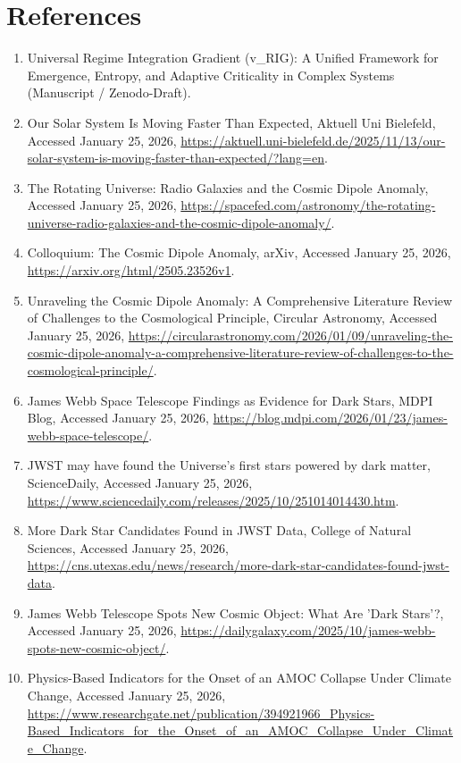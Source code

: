 \documentclass[11pt,a4paper]{article}
\begin{document}
\section*{References}

\begin{enumerate}
\item Universal Regime Integration Gradient (v\_RIG): A Unified Framework for Emergence, Entropy, and Adaptive Criticality in Complex Systems (Manuscript / Zenodo-Draft).
\item Our Solar System Is Moving Faster Than Expected, Aktuell Uni Bielefeld, Accessed January 25, 2026, \url{https://aktuell.uni-bielefeld.de/2025/11/13/our-solar-system-is-moving-faster-than-expected/?lang=en}.
\item The Rotating Universe: Radio Galaxies and the Cosmic Dipole Anomaly, Accessed January 25, 2026, \url{https://spacefed.com/astronomy/the-rotating-universe-radio-galaxies-and-the-cosmic-dipole-anomaly/}.
\item Colloquium: The Cosmic Dipole Anomaly, arXiv, Accessed January 25, 2026, \url{https://arxiv.org/html/2505.23526v1}.
\item Unraveling the Cosmic Dipole Anomaly: A Comprehensive Literature Review of Challenges to the Cosmological Principle, Circular Astronomy, Accessed January 25, 2026, \url{https://circularastronomy.com/2026/01/09/unraveling-the-cosmic-dipole-anomaly-a-comprehensive-literature-review-of-challenges-to-the-cosmological-principle/}.
\item James Webb Space Telescope Findings as Evidence for Dark Stars, MDPI Blog, Accessed January 25, 2026, \url{https://blog.mdpi.com/2026/01/23/james-webb-space-telescope/}.
\item JWST may have found the Universe's first stars powered by dark matter, ScienceDaily, Accessed January 25, 2026, \url{https://www.sciencedaily.com/releases/2025/10/251014014430.htm}.
\item More Dark Star Candidates Found in JWST Data, College of Natural Sciences, Accessed January 25, 2026, \url{https://cns.utexas.edu/news/research/more-dark-star-candidates-found-jwst-data}.
\item James Webb Telescope Spots New Cosmic Object: What Are 'Dark Stars'?, Accessed January 25, 2026, \url{https://dailygalaxy.com/2025/10/james-webb-spots-new-cosmic-object/}.
\item Physics-Based Indicators for the Onset of an AMOC Collapse Under Climate Change, Accessed January 25, 2026, \url{https://www.researchgate.net/publication/394921966_Physics-Based_Indicators_for_the_Onset_of_an_AMOC_Collapse_Under_Climate_Change}.

\end{enumerate}
\end{document}
